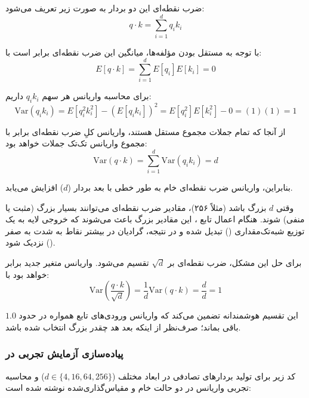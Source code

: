 \documentclass{article}
\begin{document}
ضرب نقطه‌ای این دو بردار به صورت زیر تعریف می‌شود:
\[
q \cdot k = \sum_{i=1}^{d} q_i k_i
\]

با توجه به مستقل بودن مؤلفه‌ها، میانگین این ضرب نقطه‌ای برابر است با:
\[
E[q \cdot k] = \sum_{i=1}^{d} E[q_i] E[k_i] = 0
\]

برای محاسبه واریانس هر سهم $q_i k_i$ داریم:
\[
\mathrm{Var}(q_i k_i) = E[q_i^2 k_i^2] - (E[q_i k_i])^2 = E[q_i^2] E[k_i^2] - 0 = (1)(1) = 1
\]

از آنجا که تمام جملات مجموع مستقل هستند، واریانس کلِ ضرب نقطه‌ای برابر با مجموع واریانس تک‌تک جملات خواهد بود:
\[
\mathrm{Var}(q \cdot k) = \sum_{i=1}^{d} \mathrm{Var}(q_i k_i) = d
\]

بنابراین، واریانس ضرب نقطه‌ای خام به طور خطی با بعد بردار ($d$) افزایش می‌یابد. 

وقتی $d$ بزرگ باشد (مثلاً ۲۵۶)، مقادیر ضرب نقطه‌ای می‌توانند بسیار بزرگ (مثبت یا منفی) شوند. هنگام اعمال تابع ، این مقادیر بزرگ باعث می‌شوند که خروجی لایه به یک توزیع شبه‌تک‌مقداری () تبدیل شده و در نتیجه، گرادیان در بیشتر نقاط به شدت به صفر نزدیک شود ().

برای حل این مشکل، ضرب نقطه‌ای بر $\sqrt{d}$ تقسیم می‌شود. واریانس متغیر جدید برابر خواهد بود با:
\[
\mathrm{Var}\left( \frac{q \cdot k}{\sqrt{d}} \right) = \frac{1}{d} \mathrm{Var}(q \cdot k) = \frac{d}{d} = 1
\]

این تقسیم هوشمندانه تضمین می‌کند که واریانس ورودی‌های تابع  همواره در حدود $1.0$ باقی بماند؛ صرف‌نظر از اینکه بعد هد چقدر بزرگ انتخاب شده باشد.

\subsubsection*{پیاده‌سازی آزمایش تجربی در }

کد زیر برای تولید بردارهای تصادفی در ابعاد مختلف ($d \in \{4, 16, 64, 256\}$) و محاسبه تجربی واریانس در دو حالت خام و مقیاس‌گذاری‌شده نوشته شده است:
\end{document}

